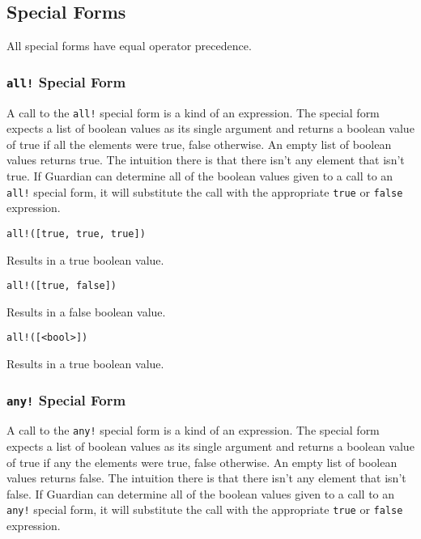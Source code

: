 
\subsection{Special Forms}
{
	All special forms have equal operator precedence.
	
	\subsubsection{\texttt{all!} Special Form}
	{
		A call to the \texttt{all!} special form is a kind of an expression.
		The special form expects a list of boolean values as its
		single argument and returns a boolean value of true if all the elements
		were true, false otherwise. An empty list of boolean values returns true.
		The intuition there is that there isn't any element that isn't true.
		If Guardian can determine all of the boolean values given to a call to an
		\texttt{all!} special form, it will substitute the call with the
		appropriate \texttt{true} or \texttt{false} expression.
		
		\begin{itemize}
		{
			\item \texttt{all!([true, true, true])}
			
				Results in a true boolean value.
			
			\item \texttt{all!([true, false])}
			
				Results in a false boolean value.
			
			\item \texttt{all!([<bool>])}
			
				Results in a true boolean value.
		}
		\end{itemize}
	}
	
	\subsubsection{\texttt{any!} Special Form}
	{
		A call to the \texttt{any!} special form is a kind of an expression.
		The special form expects a list of boolean values as its
		single argument and returns a boolean value of true if any the elements
		were true, false otherwise. An empty list of boolean values returns false.
		The intuition there is that there isn't any element that isn't false.
		If Guardian can determine all of the boolean values given to a call to an
		\texttt{any!} special form, it will substitute the call with the
		appropriate \texttt{true} or \texttt{false} expression.
		
}}
